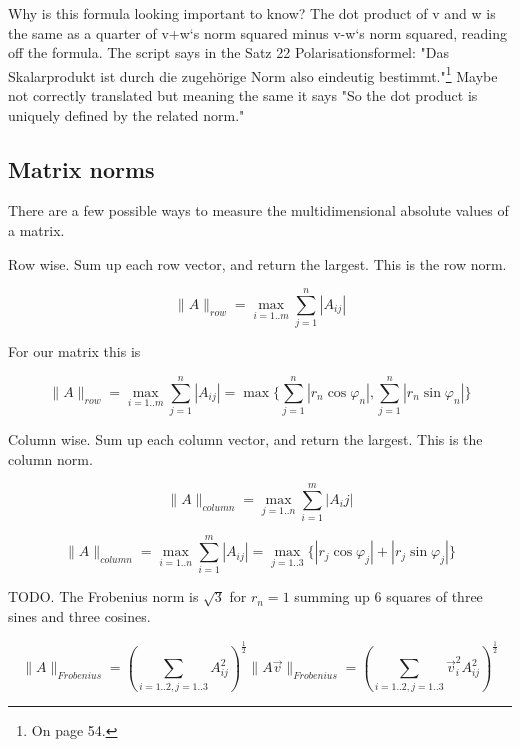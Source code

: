 \documentclass[a4paper]{article}
\begin{document}
Why is this formula looking important to know? The dot product of v and w is the same as a quarter of v+w`s norm squared minus v-w`s norm squared, reading off the formula. The script says in the Satz 22 Polarisationsformel: "Das Skalarprodukt ist durch die zugeh\"orige Norm also eindeutig bestimmt."\footnote{On page 54.} Maybe not correctly translated but meaning the same it says "So the dot product is uniquely defined by the related norm."

\subsection{Matrix norms}

There are a few possible ways to measure the multidimensional absolute values of a matrix.

Row wise. Sum up each row vector, and return the largest. This is the row norm.

\begin{displaymath}
\|A\|_{row} = \max_{i=1..m} { \sum_{j=1}^{n} |A_{ij}| }
\end{displaymath}

For our matrix this is

\begin{displaymath}
\|A\|_{row} = \max_{i=1..m} { \sum_{j=1}^{n} |A_{ij}| } = \max\{ \sum_{j=1}^{n} |r_n\cos\varphi_n|, \sum_{j=1}^{n} |r_n\sin\varphi_n| \}
\end{displaymath}


Column wise. Sum up each column vector, and return the largest. This is the column norm.

\begin{displaymath}
\|A\|_{column} = \max_{j=1..n} { \sum_{i=1}^{m} |A_{i}j| }
\end{displaymath}

\begin{displaymath}
\|A\|_{column} = \max_{i=1..n} { \sum_{i=1}^{m} |A_{ij}| } = \max_{j=1..3}\{ |r_j\cos\varphi_j| + |r_j\sin\varphi_j| \}
\end{displaymath}

TODO. The Frobenius norm is $\sqrt{3}$ for $r_n = 1$ summing up 6 squares of three sines and three cosines.

\begin{displaymath}
\|A\|_{Frobenius} = (\sum_{i=1..2,j=1..3}A_{ij}^{2})^{\frac12}
\|A\vec{v}\|_{Frobenius} = (\sum_{i=1..2,j=1..3}\vec{v}_{i}^{2}A_{ij}^{2})^{\frac12}
\end{displaymath}
\end{document}
